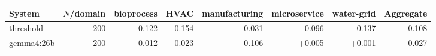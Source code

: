 \begin{tabular}{lrrrrrrr}
\toprule
System & $N$/domain & bioprocess & HVAC & manufacturing & microservice & water-grid & Aggregate \\
\midrule
threshold & 200 & -0.122 & -0.154 & -0.031 & -0.096 & -0.137 & -0.108 \\
gemma4:26b & 200 & -0.012 & -0.023 & -0.106 & +0.005 & +0.001 & -0.027 \\
\bottomrule
\end{tabular}
